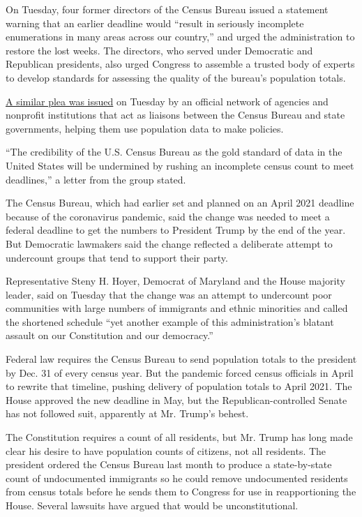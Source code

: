 On Tuesday, four former directors of the Census Bureau issued a
statement warning that an earlier deadline would ``result in seriously
incomplete enumerations in many areas across our country,'' and urged
the administration to restore the lost weeks. The directors, who served
under Democratic and Republican presidents, also urged Congress to
assemble a trusted body of experts to develop standards for assessing
the quality of the bureau's population totals.

\href{https://sdcclearinghouse.files.wordpress.com/2020/08/2020-census-timeline-july-2020.pdf}{A
similar plea was issued} on Tuesday by an official network of agencies
and nonprofit institutions that act as liaisons between the Census
Bureau and state governments, helping them use population data to make
policies.

``The credibility of the U.S. Census Bureau as the gold standard of data
in the United States will be undermined by rushing an incomplete census
count to meet deadlines,'' a letter from the group stated.

The Census Bureau, which had earlier set and planned on an April 2021
deadline because of the coronavirus pandemic, said the change was needed
to meet a federal deadline to get the numbers to President Trump by the
end of the year. But Democratic lawmakers said the change reflected a
deliberate attempt to undercount groups that tend to support their
party.

Representative Steny H. Hoyer, Democrat of Maryland and the House
majority leader, said on Tuesday that the change was an attempt to
undercount poor communities with large numbers of immigrants and ethnic
minorities and called the shortened schedule ``yet another example of
this administration's blatant assault on our Constitution and our
democracy.''

Federal law requires the Census Bureau to send population totals to the
president by Dec. 31 of every census year. But the pandemic forced
census officials in April to rewrite that timeline, pushing delivery of
population totals to April 2021. The House approved the new deadline in
May, but the Republican-controlled Senate has not followed suit,
apparently at Mr. Trump's behest.

The Constitution requires a count of all residents, but Mr. Trump has
long made clear his desire to have population counts of citizens, not
all residents. The president ordered the Census Bureau last month to
produce a state-by-state count of undocumented immigrants so he could
remove undocumented residents from census totals before he sends them to
Congress for use in reapportioning the House. Several lawsuits have
argued that would be unconstitutional.

